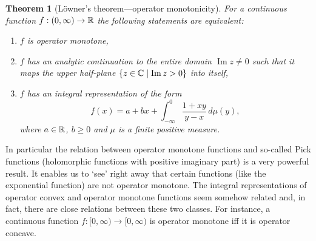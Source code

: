 \documentclass[11pt,a4paper]{article}
\theoremstyle{plain}
\newtheorem{theorem}{Theorem}[section]
\theoremstyle{definition}
\theoremstyle{remark}
\numberwithin{equation}{section}
\begin{document}
\begin{theorem}[L\"owner's theorem---operator monotonicity]
    For a continuous function $f:(0,\infty)\to \mathbb{R}$ the following statements are
    equivalent:
    \begin{enumerate}
        \item $f$ is operator monotone,
        \item $f$ has an analytic continuation to the entire domain $\operatorname{Im}z\ne 0$
              such that it maps the upper half-plane $\{z\in \mathbb{C}\mid \operatorname{Im}z>0\}$
              into itself,
        \item $f$ has an integral representation of the form
              \begin{equation}\label{eq:5.19}
                  f(x) = a + bx + \int_{-\infty}^0 \frac{1+xy}{y-x}\, d\mu(y),
              \end{equation}
              where $a\in \mathbb{R}$, $b\ge 0$ and $\mu$ is a finite positive measure.
    \end{enumerate}
\end{theorem}

In particular the relation between operator monotone functions and so-called Pick
functions (holomorphic functions with positive imaginary part) is a very powerful
result. It enables us to `see' right away that certain functions (like the exponential
function) are not operator monotone. The integral representations of operator convex
and operator monotone functions seem somehow related and, in fact, there are close
relations between these two classes. For instance, a continuous function
$f:[0,\infty)\to [0,\infty)$ is operator monotone iff it is operator concave.
\end{document}
